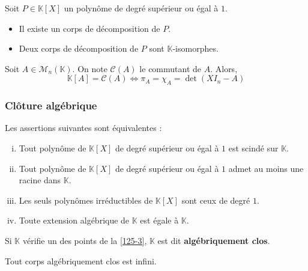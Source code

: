 	\begin{theorem}
		Soit $P \in \mathbb{K}[X]$ un polynôme de degré supérieur ou égal à $1$.
		\begin{itemize}
			\item Il existe un corps de décomposition de $P$.
			\item Deux corps de décomposition de $P$ sont $\mathbb{K}$-isomorphes.
		\end{itemize}
	\end{theorem}
	
	
	\begin{application}
		Soit $A \in \mathcal{M}_n(\mathbb{K})$. On note $\mathcal{C}(A)$ le commutant de $A$. Alors,
		\[ \mathbb{K}[A] = \mathcal{C}(A) \iff \pi_A = \chi_A = \det(XI_n - A) \]
	\end{application}
	
	\subsubsection{Clôture algébrique}
	
	
	\begin{proposition}
		\label{125-3}
		Les assertions suivantes sont équivalentes :
		\begin{enumerate}[(i)]
			\item Tout polynôme de $\mathbb{K}[X]$ de degré supérieur ou égal à $1$ est scindé sur $\mathbb{K}$.
			\item Tout polynôme de $\mathbb{K}[X]$ de degré supérieur ou égal à $1$ admet au moins une racine dans $\mathbb{K}$.
			\item Les seuls polynômes irréductibles de $\mathbb{K}[X]$ sont ceux de degré $1$.
			\item Toute extension algébrique de $\mathbb{K}$ est égale à $\mathbb{K}$.
		\end{enumerate}
	\end{proposition}
	
	\begin{definition}
		Si $\mathbb{K}$ vérifie un des points de la \cref{125-3}, $\mathbb{K}$ est dit \textbf{algébriquement clos}.
	\end{definition}
	
	\begin{proposition}
		Tout corps algébriquement clos est infini.
	\end{proposition}
	
